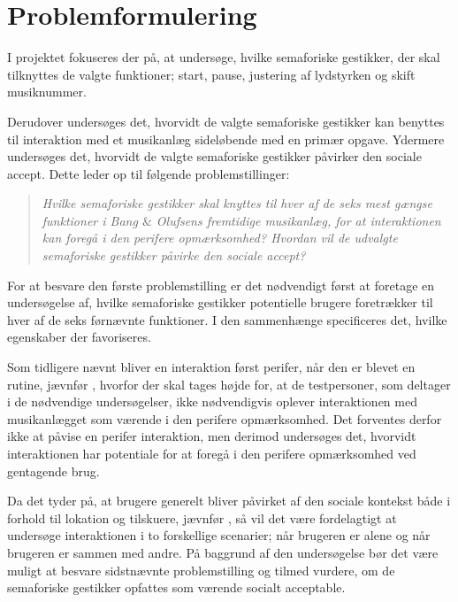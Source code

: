 \section{Problemformulering}
\label{Problemformulering}
%
I projektet fokuseres der på, at undersøge, hvilke semaforiske gestikker, der skal tilknyttes de valgte funktioner; start, pause, justering af lydstyrken og skift musiknummer. 

Derudover undersøges det, hvorvidt de valgte semaforiske gestikker kan benyttes til interaktion med et musikanlæg sideløbende med en primær opgave. Ydermere undersøges det, hvorvidt de valgte semaforiske gestikker påvirker den sociale accept. Dette leder op til følgende problemstillinger:\blankline
%
\begin{quotation}
	\noindent
	\textit{Hvilke semaforiske gestikker skal knyttes til hver af de seks mest gængse funktioner i Bang $\&$ Olufsens fremtidige musikanlæg, for at interaktionen kan foregå i den perifere opmærksomhed?\blankline
		Hvordan vil de udvalgte semaforiske gestikker påvirke den sociale accept?}\blankline
\end{quotation}
%
For at besvare den første problemstilling er det nødvendigt først at foretage en undersøgelse af, hvilke semaforiske gestikker potentielle brugere foretrækker til hver af de seks førnævnte funktioner. I den sammenhænge specificeres det, hvilke egenskaber der favoriseres.

Som tidligere nævnt bliver en interaktion først perifer, når den er blevet en rutine, jævnfør , hvorfor der skal tages højde for, at de testpersoner, som deltager i de nødvendige undersøgelser, ikke nødvendigvis oplever interaktionen med musikanlægget som værende i den perifere opmærksomhed. Det forventes derfor ikke at påvise en perifer interaktion, men derimod undersøges det, hvorvidt interaktionen har potentiale for at foregå i den perifere opmærksomhed ved gentagende brug. 

Da det tyder på, at brugere generelt bliver påvirket af den sociale kontekst både i forhold til lokation og tilskuere, jævnfør , så vil det være fordelagtigt at undersøge interaktionen i to forskellige scenarier; når brugeren er alene og når brugeren er sammen med andre. På baggrund af den undersøgelse bør det være muligt at besvare sidstnævnte problemstilling og tilmed vurdere, om de semaforiske gestikker opfattes som værende socialt acceptable. 




